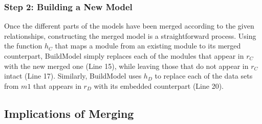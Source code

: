 
\subsubsection{Step 2: Building a New Model}

Once the different parts of the models have been merged according to
the given relationships, constructing the merged model is a
straightforward process. Using the function $h_{C}$ that maps a module
from an existing module to its merged counterpart, \textsf{BuildModel}
simply replaces each of the modules that appear in $r_{C}$ with the
new merged one (Line 15), while leaving those that do not appear in
$r_{C}$ intact (Line 17). Similarly, \textsf{BuildModel} uses $h_{D}$
to replace each of the data sets from $m1$ that appears in $r_{D}$
with its embedded counterpart (Line 20).  

\subsection{Implications of Merging}

